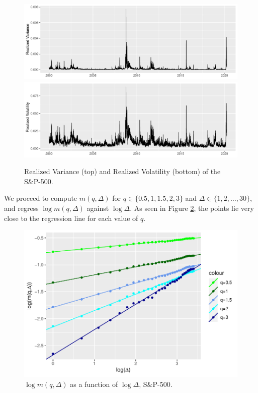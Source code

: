 \begin{figure}[H]
    \centering
    \includegraphics[scale=0.6]{fig/img/RealizedLib/realized_variance_longplot.pdf}
    \includegraphics[scale=0.6]{fig/img/RealizedLib/realized_volatility_longplot.pdf}
    \caption{Realized Variance (top) and Realized Volatility (bottom) of the S\&P-500.}
    \label{fig:realized}
\end{figure}
We proceed to compute $m(q,\Delta)$ for $q\in \{0.5,1,1.5,2,3\}$ and $\Delta \in \{1,2,\dots,30\}$, and regress $\log m(q,\Delta)$ against $\log\Delta$. As seen in Figure \ref{fig: Linear_reg}, the points lie very close to the regression line for each value of $q$.
\begin{figure}[H]
    \centering
    \includegraphics[scale=0.8]{fig/img/RealizedLib/Linear_Reg_rigtig.pdf}
    \caption{$\log m(q,\Delta)$ as a function of $\log\Delta$, S\&P-500.}
    \label{fig: Linear_reg}
\end{figure}

